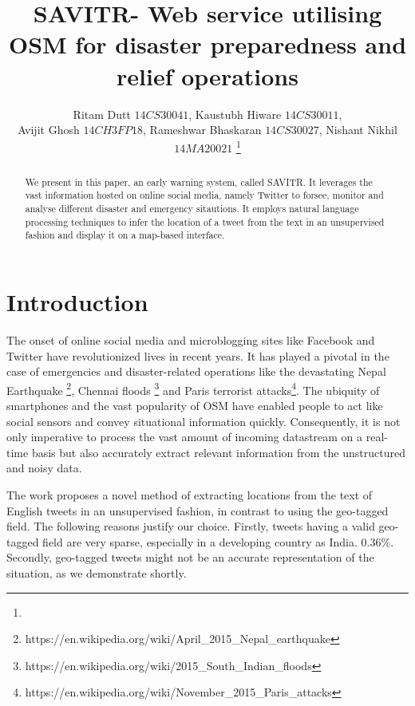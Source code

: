 \documentclass[journal, a4paper]{IEEEtran}
\begin{document}
	\title{SAVITR- Web service utilising OSM for disaster preparedness and relief operations}
	\author{Ritam Dutt \(14CS30041\), Kaustubh Hiware \(14CS30011\),\\ Avijit Ghosh \(14CH3FP18\), Rameshwar Bhaskaran \(14CS30027\), Nishant Nikhil \(14MA20021\)
	\thanks{}}
	\markboth{}{}
	\maketitle

\begin{abstract}
	We present in this paper, an early warning system, called SAVITR. It leverages the vast information hosted on online social media, namely Twitter to forsee, monitor and analyse different disaster and emergency sitautions. It employs natural language processing techniques to infer the location of a tweet from the text in an unsupervised fashion and display it on a map-based interface. 
\end{abstract}

\section{Introduction}
	The onset of online social media and microblogging sites like Facebook and Twitter have revolutionized lives in recent years. It has played a pivotal in the case of emergencies and disaster-related operations like the devastating Nepal Earthquake \footnote{https://en.wikipedia.org/wiki/April\_2015\_Nepal\_earthquake}, Chennai floods \footnote{https://en.wikipedia.org/wiki/2015\_South\_Indian\_floods} and Paris terrorist attacks\footnote{https://en.wikipedia.org/wiki/November\_2015\_Paris\_attacks}.
	The ubiquity of smartphones and the vast popularity of OSM have enabled people to act like social sensors and convey situational information quickly. Consequently, it is not only imperative to process the vast amount of incoming datastream on a real-time basis but also accurately extract relevant information from the unstructured and noisy data.
	
	The work proposes a novel method of extracting locations from the text of English tweets in an unsupervised fashion, in contrast to using the geo-tagged field. The following reasons justify our choice. Firstly, tweets having a valid geo-tagged field are very sparse, especially in a developing country as India. \(0.36\%\). Secondly, geo-tagged tweets might not be an accurate representation of the situation, as we demonstrate shortly. 
	
\end{document}
